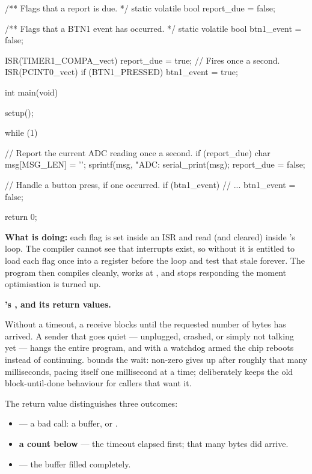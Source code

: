 \begin{ccode}
/** Flags that a report is due. */
static volatile bool report_due = false;

/** Flags that a BTN1 event has occurred. */
static volatile bool btn1_event = false;

ISR(TIMER1_COMPA_vect) { report_due = true; }                  // Fires once a second.
ISR(PCINT0_vect)       { if (BTN1_PRESSED) { btn1_event = true; } }

int main(void)
{
    setup();

    while (1)
    {
        // Report the current ADC reading once a second.
        if (report_due)
        {
            char msg[MSG_LEN] = {'\0'};
            sprintf(msg, "ADC: %
            serial_print(msg);
            report_due = false;
        }

        // Handle a button press, if one occurred.
        if (btn1_event)
        {
            // ...
            btn1_event = false;
        }
    }
    return 0;
}
\end{ccode}

\noindent\textbf{What  is doing:} each flag is set inside an ISR and read (and
cleared) inside 's loop. The compiler cannot see that interrupts exist, so without
 it is entitled to load each flag once into a register before the loop and test that
stale  forever. The program then compiles cleanly, works at , and stops
responding the moment optimisation is turned up.

\textbf{'s , and its return values.} 

Without a timeout, a receive blocks until the requested number of bytes has arrived. A sender that
goes quiet --- unplugged, crashed, or simply not talking yet --- hangs the entire program, and with
a watchdog armed the chip reboots instead of continuing.  bounds the wait: non-zero
gives up after roughly that many milliseconds, pacing itself one millisecond at a time; 
deliberately keeps the old block-until-done behaviour for callers that want it.

The return value distinguishes three outcomes:
\begin{itemize}
  \item \textbf{} --- a bad call: a  buffer, or .
  \item \textbf{a count below } --- the timeout elapsed first; that many bytes did
    arrive.
  \item \textbf{} --- the buffer filled completely.
\end{itemize}

